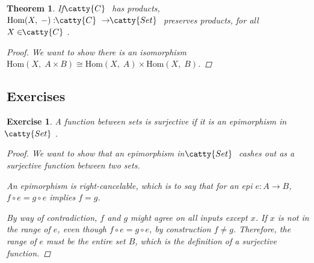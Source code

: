 \documentclass[]{article}
\newtheorem{theorem}{Theorem}
\newtheorem{exercise}{Exercise}
\renewcommand{\hom}[2]{\ensuremath{\text{Hom}(#1,\;#2)}}
\newcommand{\tfarr}[4][\to]{\ensuremath{#2 : #3 #1 #4}}
\newcommand{\functor}[3]{\ensuremath{#1 : \cat{#2} \to \cat{#3}}}
\newcommand{\cat}[1]{\ensuremath{\!\! \catty{#1} \,\,}}
\begin{document}
\begin{theorem}
  If \cat{C} has products, \functor{\hom{X}{-}}{C}{Set} preserves products, for
  all $X \in \cat{C}$.

  \begin{proof}
    We want to show there is an isomorphism $\hom{X}{A\times B}\cong
    \hom{X}{A} \times \hom{X}{B}$.

  \end{proof}
\end{theorem}


\subsection{Exercises}

\begin{exercise}
  A function between sets is surjective if it is an epimorphism in \cat{Set}.

  \begin{proof}
    We want to show that an epimorphism in \cat{Set} cashes out as a surjective
    function between two sets.

    An epimorphism is right-cancelable, which is to say that for an epi
    \tfarr{e}{A}{B},
    $f\circ e = g\circ e$ implies $f = g$.

    By way of contradiction, $f$ and $g$ might agree on all inputs except $x$.
    If $x$ is not in the range of $e$, even though $f\circ e = g\circ e$, by
    construction $f \not = g$. Therefore, the range of $e$ must be the entire
    set $B$, which is the definition of a surjective function.
  \end{proof}
\end{exercise}
\end{document}
